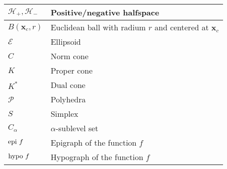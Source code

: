 \documentclass{article}
\begin{document}
\begin{xltabular}{\textwidth}{XX}
	\(\mathcal{H}_{+}, \mathcal{H}_{-}\)          & Positive/negative halfspace                                                                                                                                                                                    \\ \hline
	\(B(\mathbf{x}_c, r)\)                        & Euclidean ball with radium \(r\) and centered at \(\mathbf{x}_c\)                                                                                                                                              \\ \hline
	\(\mathcal{E}\)                               & Ellipsoid                                                                                                                                                                                                      \\ \hline
	\(C\)                                         & Norm cone                                                                                                                                                                                                      \\ \hline
	\(K\)                                         & Proper cone                                                                                                                                                                                                    \\ \hline
	\(K^*\)                                       & Dual cone                                                                                                                                                                                                      \\ \hline
	\(\mathcal{P}\)                               & Polyhedra                                                                                                                                                                                                      \\ \hline
	\(S\)                                         & Simplex                                                                                                                                                                                                        \\ \hline
	\(C_\alpha\)                                  & \(\alpha\)-sublevel set                                                                                                                                                                                        \\ \hline
	\(\textnormal{epi } f\)                       & Epigraph of the function \(f\)                                                                                                                                                                                 \\ \hline
	\(\textnormal{hypo } f\)                      & Hypograph of the function \(f\)
\end{xltabular}
\end{document}
